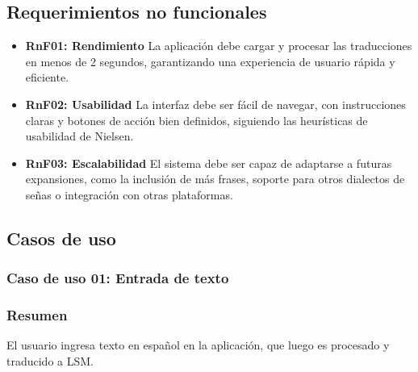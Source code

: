 \subsection{Requerimientos no funcionales}
\begin{itemize}
    \item \textbf{RnF01: Rendimiento}  
    La aplicación debe cargar y procesar las traducciones en menos de 2 segundos, garantizando una experiencia de usuario rápida y eficiente.
    
    \item \textbf{RnF02: Usabilidad}  
    La interfaz debe ser fácil de navegar, con instrucciones claras y botones de acción bien definidos, siguiendo las heurísticas de usabilidad de Nielsen.
    
    
    \item \textbf{RnF03: Escalabilidad}  
    El sistema debe ser capaz de adaptarse a futuras expansiones, como la inclusión de más frases, soporte para otros dialectos de señas o integración con otras plataformas.
\end{itemize}
\subsection{Casos de uso}
\subsubsection{Caso de uso 01: Entrada de texto}
\subsubsection{Resumen}
El usuario ingresa texto en español en la aplicación, que luego es procesado y traducido a LSM.
